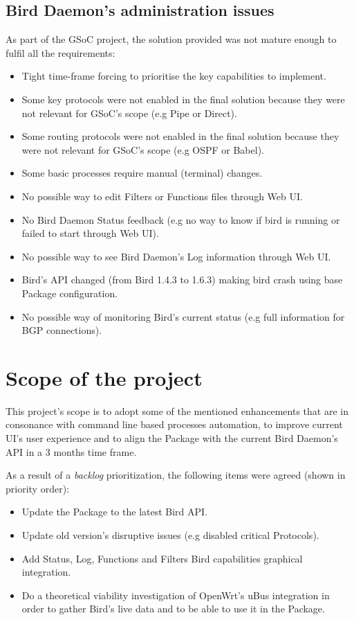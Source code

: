 \subsection{Bird Daemon's administration issues}
\label{subsec:bdai}
As part of the GSoC project, the solution provided was not mature enough to fulfil all the requirements:
\begin{itemize}
    \item Tight time-frame forcing to prioritise the key capabilities to implement.
    \item Some key protocols were not enabled in the final solution because they were not relevant for GSoC's scope (e.g Pipe or Direct).
    \item Some routing protocols were not enabled in the final solution because they were not relevant for GSoC's scope (e.g OSPF or Babel).
    \item Some basic processes require manual (terminal) changes.
    \item No possible way to edit Filters or Functions files through Web UI.
    \item No Bird Daemon Status feedback (e.g no way to know if bird is running or failed to start through Web UI).
    \item No possible way to see Bird Daemon's Log information through Web UI.
    \item Bird's API changed (from Bird 1.4.3 to 1.6.3) making bird crash using base Package configuration.
    \item No possible way of monitoring Bird's current status (e.g full information for BGP connections).
\end{itemize}


\section{Scope of the project}
\label{sec:sotp}
This project's scope is to adopt some of the mentioned enhancements that are in consonance with command line based processes automation, to improve current UI's user experience and to align the Package with the current Bird Daemon's API in a 3 months time frame.

As a result of a \textit{backlog} prioritization, the following items were agreed (shown in priority order):
\begin{itemize}
    \item Update the Package to the latest Bird API.
    \item Update old version's disruptive issues (e.g disabled critical Protocols).
    \item Add Status, Log, Functions and Filters Bird capabilities graphical integration.
    \item Do a theoretical viability investigation of OpenWrt's uBus integration in order to gather Bird's live data and to be able to use it in the Package.
\end{itemize}


